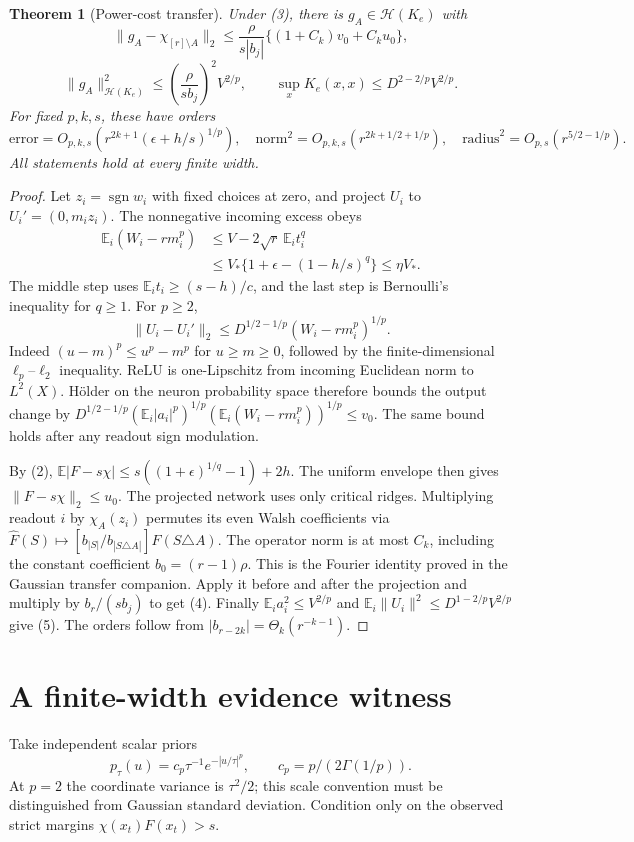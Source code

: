 \documentclass[11pt]{article}
\newtheorem{theorem}{Theorem}\newtheorem{lemma}[theorem]{Lemma}
\newcommand{\E}{\mathbb E}\newcommand{\R}{\mathbb R}
\begin{document}
\begin{theorem}[Power-cost transfer]\label{thm:det}
Under (3), there is $g_A\in\mathcal H(K_e)$ with
\[
 \|g_A-\chi_{[r]\setminus A}\|_2
 \le\frac{\rho}{s|b_j|}\{(1+C_k)v_0+C_k u_0\},        \tag{4}
\]
\[
 \|g_A\|_{\mathcal H(K_e)}^2
       \le\left(\frac{\rho}{s b_j}\right)^2 V^{2/p},
 \qquad \sup_xK_e(x,x)\le D^{2-2/p}V^{2/p}.            \tag{5}
\]
For fixed $p,k,s$, these have orders
\[
 \text{error}=O_{p,k,s}(r^{2k+1}(\epsilon+h/s)^{1/p}),
 \quad \text{norm}^2=O_{p,k,s}(r^{2k+1/2+1/p}),
 \quad \text{radius}^2=O_{p,s}(r^{5/2-1/p}).           \tag{6}
\]
All statements hold at every finite width.
\end{theorem}
\begin{proof}
Let $z_i=\operatorname{sgn}w_i$ with fixed choices at zero, and project
$U_i$ to $U_i'=(0,m_i z_i)$. The nonnegative incoming excess obeys
\begin{align*}
 \E_i(W_i-rm_i^p)
 &\le V-2\sqrt r\,\E_i t_i^q\\
 &\le V_\ast\{1+\epsilon-(1-h/s)^q\}\le\eta V_*.
\end{align*}
The middle step uses $\E_i t_i\ge(s-h)/c$, and the last step is
Bernoulli's inequality for $q\ge1$.
For $p\ge2$,
\[
 \|U_i-U_i'\|_2
 \le D^{1/2-1/p}(W_i-rm_i^p)^{1/p}.
\]
Indeed $(u-m)^p\le u^p-m^p$ for $u\ge m\ge0$, followed by the
finite-dimensional $\ell_p$--$\ell_2$ inequality.
ReLU is one-Lipschitz from incoming Euclidean norm to $L^2(X)$.
H\"older on the neuron probability space therefore bounds the output
change by
$D^{1/2-1/p}(\E_i|a_i|^p)^{1/p}
(\E_i(W_i-rm_i^p))^{1/p}\le v_0$.
The same bound holds after any readout sign modulation.

By (2), $\E|F-s\chi|\le s((1+\epsilon)^{1/q}-1)+2h$.
The uniform envelope then gives $\|F-s\chi\|_2\le u_0$.
The projected network uses only critical ridges. Multiplying readout
$i$ by $\chi_A(z_i)$ permutes its even Walsh coefficients via
$\widehat F(S)\mapsto
[b_{|S|}/b_{|S\triangle A|}]\widehat F(S\triangle A)$.
The operator norm is at most $C_k$, including the constant coefficient
$b_0=(r-1)\rho$. This is the Fourier identity proved in the Gaussian
transfer companion. Apply it before and after the projection and multiply
by $b_r/(s b_j)$ to get (4).
Finally $\E_i a_i^2\le V^{2/p}$ and
$\E_i\|U_i\|^2\le D^{1-2/p}V^{2/p}$ give (5).
The orders follow from $|b_{r-2k}|=\Theta_k(r^{-k-1})$.
\end{proof}

\section{A finite-width evidence witness}
Take independent scalar priors
\[
 p_\tau(u)=c_p\tau^{-1}e^{-|u/\tau|^p},\qquad
                     c_p=p/(2\Gamma(1/p)).             \tag{7}
\]
At $p=2$ the coordinate variance is $\tau^2/2$; this scale convention
must be distinguished from Gaussian standard deviation.
Condition only on the observed strict margins $\chi(x_t)F(x_t)>s$.
\end{document}
